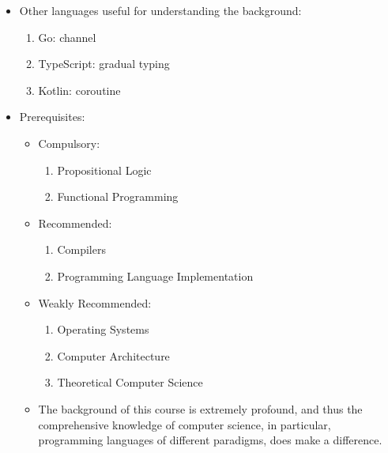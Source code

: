 \documentclass{article}
\begin{document}
\begin{itemize}
\begin{itemize}
\begin{itemize}
\begin{itemize}
                        \item Other languages useful for understanding the background:
                        \begin{enumerate}
                            \item Go: channel
                            \item TypeScript: gradual typing
                            \item Kotlin: coroutine
                        \end{enumerate}
                        \item Prerequisites:
                        \begin{itemize}
                            \item Compulsory:
                            \begin{enumerate}
                                \item Propositional Logic
                                \item Functional Programming
                            \end{enumerate}
                            \item Recommended:
                            \begin{enumerate}
                                \item Compilers
                                \item Programming Language Implementation
                            \end{enumerate}
                            \item Weakly Recommended:
                            \begin{enumerate}
                                \item Operating Systems
                                \item Computer Architecture
                                \item Theoretical Computer Science
                            \end{enumerate}
                            \item The background of this course is extremely profound, and thus the comprehensive knowledge of computer science, in particular, programming languages of different paradigms, does make a difference.
                        \end{itemize}


\end{itemize}
\end{itemize}
\end{itemize}
\end{itemize}
\end{document}
